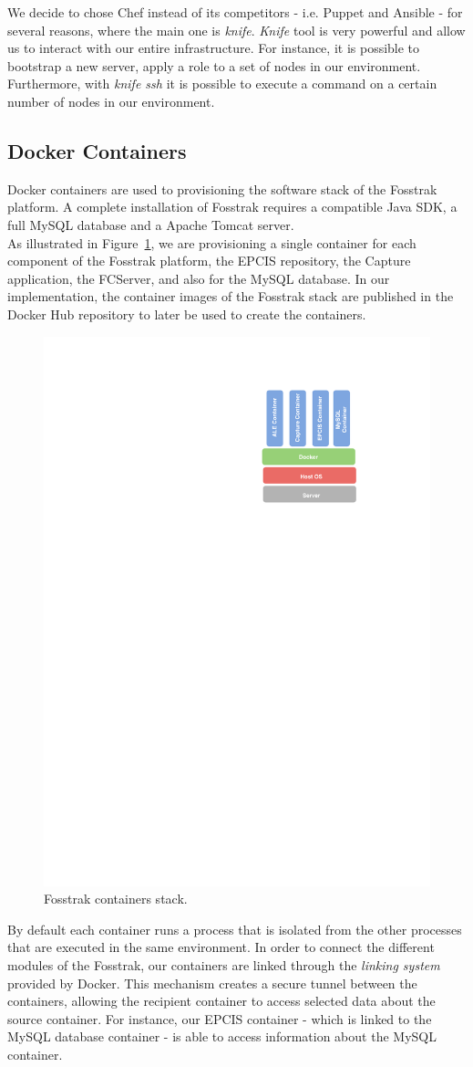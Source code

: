 We decide to chose Chef instead of its competitors - i.e. Puppet and Ansible - for several
reasons, where the main one is \textit{knife}. \textit{Knife} tool is very powerful and allow us to
interact with our entire infrastructure. For instance, it is possible to bootstrap a new server,
apply a role to a set of nodes in our environment. Furthermore, with \textit{knife ssh} it is
possible to execute a command on a certain number of nodes in our environment.

\subsection{Docker Containers}
\label{sub:impl_docker}
Docker containers are used to provisioning the software stack of the Fosstrak platform. A complete
installation of Fosstrak requires a compatible Java \gls{SDK}, a full MySQL database and a Apache Tomcat
server.\\

As illustrated in Figure~\ref{fig:impl_containers}, we are provisioning a single container for each
component of the Fosstrak platform, the \gls{EPCIS} repository, the Capture application, the \gls{FCServer},
and also for the MySQL database. In our implementation, the container images of the Fosstrak stack
are published in the Docker Hub repository to later be used to create the containers.\\

\begin{figure}[!ht]
  \centering
  \includegraphics[width=.3\textwidth]{./images/docker-stack}
  \caption[Fosstrak containers stack.]{Fosstrak containers stack.}
  \label{fig:impl_containers}
\end{figure}

By default each container runs a process that is isolated from the other processes that are executed
in the same environment. In order to connect the different modules of the Fosstrak, our containers are
linked through the \textit{linking system} provided by Docker. This mechanism creates a secure tunnel
between the containers, allowing the recipient container to access selected data about the source container.
For instance, our \gls{EPCIS} container - which is linked to the MySQL database container - is able to
access information about the MySQL container.\\

